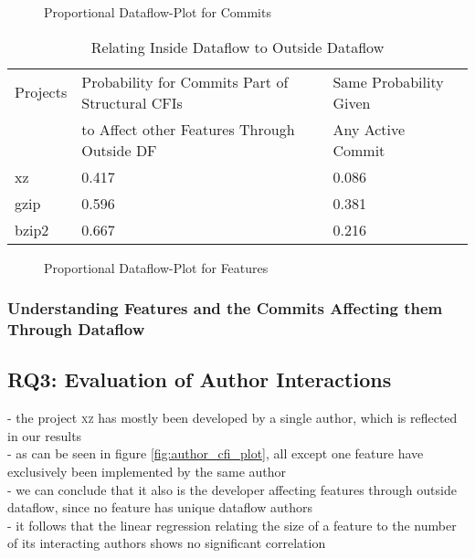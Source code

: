 \begin{figure}[htbp]
  \centering
  
  \caption{Proportional Dataflow-Plot for Commits}
  \label{fig:commit_dfbr_plot}
\end{figure}

\begin{table}[t]
\caption{Relating Inside Dataflow to Outside Dataflow}
\label{tab:commit_dfbr_rel_table}
\begin{tabular}{lll}
 Projects & Probability for Commits Part of Structural CFIs & Same Probability Given 	\\
 	  & to Affect other Features Through Outside DF     & Any Active Commit		\\
xz & 0.417 & 0.086 \\
gzip & 0.596 & 0.381 \\
bzip2 & 0.667 & 0.216 \\
\end{tabular}
\end{table}

\clearpage

\begin{figure}[htbp]
  \centering
  
  \caption{Proportional Dataflow-Plot for Features}
  \label{fig:feature_dfbr_plot}
\end{figure}

\clearpage

\subsubsection*{Understanding Features and the Commits Affecting them Through Dataflow}\label{sec:eval_feature_dfbr}

\subsection*{\textbf{RQ3: Evaluation of Author Interactions}}\label{sec:eval_author_interactions}

- the project \textsc{xz} has mostly been developed by a single author, which is reflected in our results \\
- as can be seen in figure \ref{fig:author_cfi_plot}, all except one feature have exclusively been implemented by the same author \\
- we can conclude that it also is the developer affecting features through outside dataflow, since no feature has unique dataflow authors \\
- it follows that the linear regression relating the size of a feature to the number of its interacting authors shows no significant correlation \\

